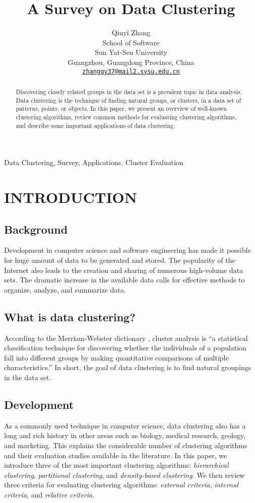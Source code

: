 \documentclass[conference]{IEEEtran}
\title{\LARGE \bf A Survey on Data Clustering}
\author{
Qiuyi Zhang \\
School of Software \\
Sun Yat-Sen University \\
Guangzhou, Guangdong Province, China \\
{\tt \href{mailto:zhangqy37@mail2.sysu.edu.cn}{zhangqy37@mail2.sysu.edu.cn}}
}
\begin{document}
\maketitle
\begin{abstract}
Discovering closely related groups in the data set is a prevalent topic in data analysis. Data clustering is the technique of finding natural groups, or clusters, in a data set of patterns, points, or objects. In this paper, we present an overview of well-known clustering algorithms, review common methods for evaluating clustering algorithms, and describe some important applications of data clustering.
\end{abstract}

\begin{IEEEkeywords}
Data Clustering, Survey, Applications, Cluster Evaluation
\end{IEEEkeywords}
\section{INTRODUCTION}\label{sec:Introduction}
\subsection{Background}
Development in computer science and software engineering has made it possible for huge amount of data to be generated and stored. The popularity of the Internet also leads to the creation and sharing of numerous high-volume data sets. The dramatic increase in the available data calls for effective methods to organize, analyze, and summarize data. 

\subsection{What is data clustering?}
According to the Merriam-Webster dictionary \cite{webster2006merriam}, cluster analysis is ``a statistical classification technique for discovering whether the individuals of a population fall into different groups by making quantitative comparisons of multiple characteristics.'' In short, the goal of data clustering is to find natural groupings in the data set. 

\subsection{Development}
As a commonly used technique in computer science, data clustering also has a long and rich history in other areas such as biology, medical research, geology, and marketing. This explains the considerable number of clustering algorithms and their evaluation studies available in the literature. In this paper, we introduce three of the most important clustering algorithms: \textit{hierarchical clustering}, \textit{partitional clustering}, and \textit{density-based clustering}. We then review three criteria for evaluating clustering algorithms: \textit{external criteria}, \textit{internal criteria}, and \textit{relative criteria}.
\end{document}
